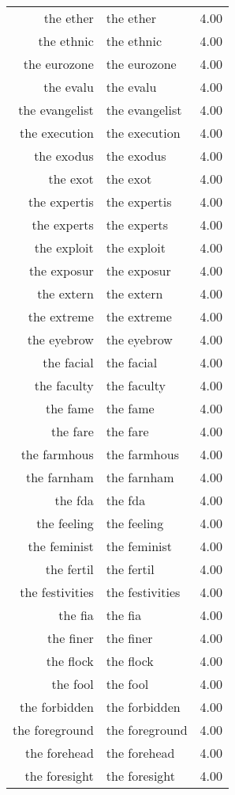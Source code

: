 \begin{table}[ht]
\begin{tabular}{rlr}
  the ether & the ether & 4.00 \\ 
  the ethnic & the ethnic & 4.00 \\ 
  the eurozone & the eurozone & 4.00 \\ 
  the evalu & the evalu & 4.00 \\ 
  the evangelist & the evangelist & 4.00 \\ 
  the execution & the execution & 4.00 \\ 
  the exodus & the exodus & 4.00 \\ 
  the exot & the exot & 4.00 \\ 
  the expertis & the expertis & 4.00 \\ 
  the experts & the experts & 4.00 \\ 
  the exploit & the exploit & 4.00 \\ 
  the exposur & the exposur & 4.00 \\ 
  the extern & the extern & 4.00 \\ 
  the extreme & the extreme & 4.00 \\ 
  the eyebrow & the eyebrow & 4.00 \\ 
  the facial & the facial & 4.00 \\ 
  the faculty & the faculty & 4.00 \\ 
  the fame & the fame & 4.00 \\ 
  the fare & the fare & 4.00 \\ 
  the farmhous & the farmhous & 4.00 \\ 
  the farnham & the farnham & 4.00 \\ 
  the fda & the fda & 4.00 \\ 
  the feeling & the feeling & 4.00 \\ 
  the feminist & the feminist & 4.00 \\ 
  the fertil & the fertil & 4.00 \\ 
  the festivities & the festivities & 4.00 \\ 
  the fia & the fia & 4.00 \\ 
  the finer & the finer & 4.00 \\ 
  the flock & the flock & 4.00 \\ 
  the fool & the fool & 4.00 \\ 
  the forbidden & the forbidden & 4.00 \\ 
  the foreground & the foreground & 4.00 \\ 
  the forehead & the forehead & 4.00 \\ 
  the foresight & the foresight & 4.00 \\ 

\end{tabular}
\end{table}
